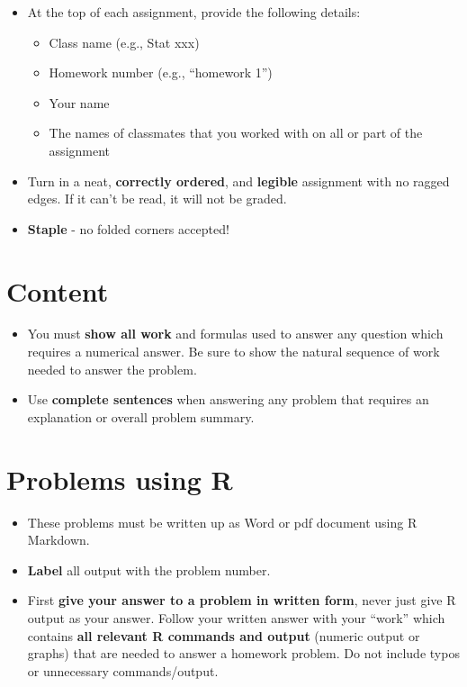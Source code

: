 \documentclass[
]{book}
\providecommand{\tightlist}{%
  \setlength{\itemsep}{0pt}\setlength{\parskip}{0pt}}
\begin{document}
\begin{itemize}
\tightlist
\item
  At the top of each assignment, provide the following details:

  \begin{itemize}
  \tightlist
  \item
    Class name (e.g., Stat xxx)
  \item
    Homework number (e.g., ``homework 1'')
  \item
    Your name
  \item
    The names of classmates that you worked with on all or part of the assignment
  \end{itemize}
\item
  Turn in a neat, \textbf{correctly ordered}, and \textbf{legible} assignment with no ragged edges. If it can't be read, it will not be graded.
\item
  \textbf{Staple} - no folded corners accepted!
\end{itemize}

\hypertarget{content}{%
\section{Content}\label{content}}

\begin{itemize}
\tightlist
\item
  You must \textbf{show all work} and formulas used to answer any question which requires a numerical answer. Be sure to show the natural sequence of work needed to answer the problem.
\item
  Use \textbf{complete sentences} when answering any problem that requires an explanation or overall problem summary.
\end{itemize}

\hypertarget{problems-using-r}{%
\section{Problems using R}\label{problems-using-r}}

\begin{itemize}
\tightlist
\item
  These problems must be written up as Word or pdf document using R Markdown.
\item
  \textbf{Label} all output with the problem number.
\item
  First \textbf{give your answer to a problem in written form}, never just give R output as your answer. Follow your written answer with your ``work'' which contains \textbf{all relevant R commands and output} (numeric output or graphs) that are needed to answer a homework problem. Do not include typos or unnecessary commands/output.
\end{itemize}
\end{document}
